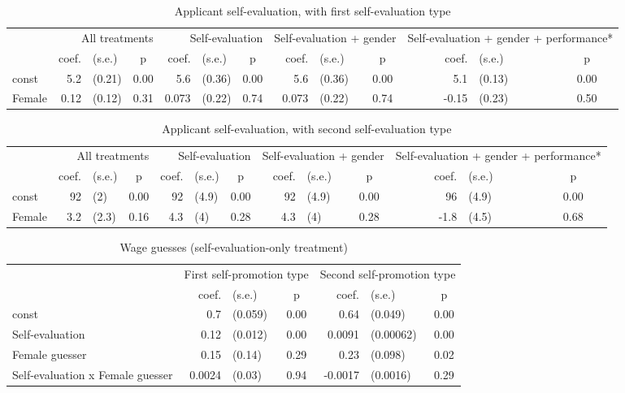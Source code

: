 \begin{table}
\centering
\caption{Applicant self-evaluation, with first self-evaluation type}
\begin{tabular}{lrlc|rlc|rlc|rlc}
\toprule
 & \multicolumn{3}{p{12em}}{All treatments} & \multicolumn{3}{p{12em}}{Self-evaluation} & \multicolumn{3}{p{12em}}{Self-evaluation + gender} & \multicolumn{3}{p{12em}}{Self-evaluation + gender + performance*} \\
 & coef. & (s.e.) & p & coef. & (s.e.) & p & coef. & (s.e.) & p & coef. & (s.e.) & p \\
\midrule
const & 5.2 & (0.21) & 0.00 & 5.6 & (0.36) & 0.00 & 5.6 & (0.36) & 0.00 & 5.1 & (0.13) & 0.00 \\
Female & 0.12 & (0.12) & 0.31 & 0.073 & (0.22) & 0.74 & 0.073 & (0.22) & 0.74 & -0.15 & (0.23) & 0.50 \\
\bottomrule
\end{tabular}
\end{table}

\begin{table}
\centering
\caption{Applicant self-evaluation, with second self-evaluation type}
\begin{tabular}{lrlc|rlc|rlc|rlc}
\toprule
 & \multicolumn{3}{p{12em}}{All treatments} & \multicolumn{3}{p{12em}}{Self-evaluation} & \multicolumn{3}{p{12em}}{Self-evaluation + gender} & \multicolumn{3}{p{12em}}{Self-evaluation + gender + performance*} \\
 & coef. & (s.e.) & p & coef. & (s.e.) & p & coef. & (s.e.) & p & coef. & (s.e.) & p \\
\midrule
const & 92 & (2) & 0.00 & 92 & (4.9) & 0.00 & 92 & (4.9) & 0.00 & 96 & (4.9) & 0.00 \\
Female & 3.2 & (2.3) & 0.16 & 4.3 & (4) & 0.28 & 4.3 & (4) & 0.28 & -1.8 & (4.5) & 0.68 \\
\bottomrule
\end{tabular}
\end{table}

\begin{table}
\centering
\caption{Wage guesses (self-evaluation-only treatment)}
\begin{tabular}{lrlc|rlc}
\toprule
 & \multicolumn{3}{p{12em}}{First self-promotion type} & \multicolumn{3}{p{12em}}{Second self-promotion type} \\
 & coef. & (s.e.) & p & coef. & (s.e.) & p \\
\midrule
const & 0.7 & (0.059) & 0.00 & 0.64 & (0.049) & 0.00 \\
Self-evaluation & 0.12 & (0.012) & 0.00 & 0.0091 & (0.00062) & 0.00 \\
Female guesser & 0.15 & (0.14) & 0.29 & 0.23 & (0.098) & 0.02 \\
Self-evaluation x Female guesser & 0.0024 & (0.03) & 0.94 & -0.0017 & (0.0016) & 0.29 \\
\bottomrule
\end{tabular}
\end{table}

